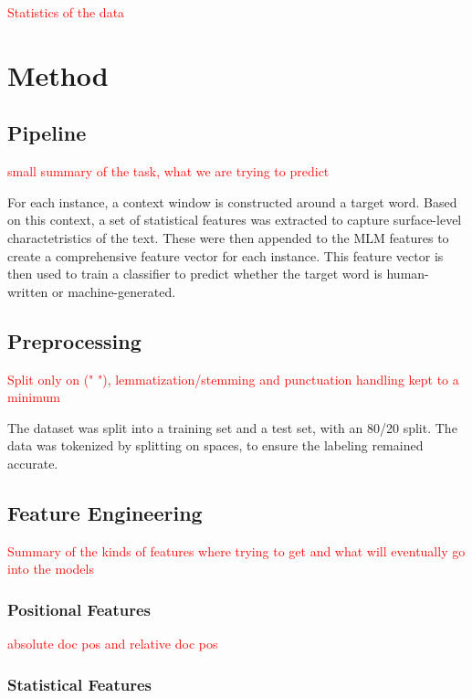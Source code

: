 \documentclass[11pt]{article}
\begin{document}
\textcolor{red}{Statistics of the data}
\\

\section{Method}

\subsection{Pipeline}

\textcolor{red}{small summary of the task, what we are trying to predict}

For each instance, a context window is constructed around a target word.
Based on this context, a set of statistical features was extracted to capture surface-level charactetristics of the text.
These were then appended to the MLM features to create a comprehensive feature vector for each instance.
This feature vector is then used to train a classifier to predict whether the target word is human-written or machine-generated.

\subsection{Preprocessing}

\textcolor{red}{Split only on (" "), lemmatization/stemming and punctuation handling kept to a minimum}

The dataset was split into a training set and a test set, with an 80/20 split.
The data was tokenized by splitting on spaces, to ensure the labeling remained accurate.

\subsection{Feature Engineering}

\textcolor{red}{Summary of the kinds of features where trying to get and what will eventually go into the models}

\subsubsection{Positional Features}

\textcolor{red}{absolute doc pos and relative doc pos}

\subsubsection{Statistical Features}
\end{document}
